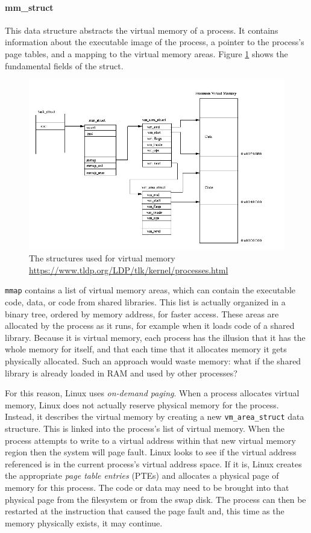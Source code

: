 \paragraph{mm\_struct} 
This data structure abstracts the virtual memory of a process. It contains information about the executable image of the process, a pointer to the process's page tables, and a mapping to the virtual memory areas. Figure \ref{img:mm} shows the fundamental fields of the struct.

\begin{figure}[ht]
\includegraphics[width=\textwidth]{images/mm.jpg}
\caption{The structures used for virtual memory \url{https://www.tldp.org/LDP/tlk/kernel/processes.html}}
\label{img:mm}
\end{figure}
\verb|mmap| contains a list of virtual memory areas, which can contain the executable code, data, or code from shared libraries.
This list is actually organized in a binary tree, ordered by memory address, for faster access. These areas are allocated by the process as it runs, for example when it loads code of a shared library. Because it is virtual memory, each process has the illusion that it has the whole memory for itself, and that each time that it allocates memory it gets physically allocated. Such an approach would waste memory: what if the shared library is already loaded in RAM and used by other processes?

For this reason, Linux uses \textit{on-demand paging}. When a process allocates virtual memory, Linux does not actually reserve physical memory for the process. Instead, it describes the virtual memory by creating a new \verb|vm_area_struct| data structure. This is linked into the process's list of virtual memory. When the process attempts to write to a virtual address within that new virtual memory region then the system will page fault. Linux looks to see if the virtual address referenced is in the current process's virtual address space. If it is, Linux creates the appropriate \textit{page table entries} (PTEs) and allocates a physical page of memory for this process. The code or data may need to be brought into that physical page from the filesystem or from the swap disk. The process can then be restarted at the instruction that caused the page fault and, this time as the memory physically exists, it may continue.\cite{tlk}

